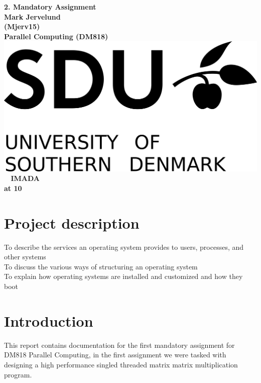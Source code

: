\documentclass[a4paper,10pt,titlepage]{report}
\date{}
\begin{document}
\begin{titlepage}
\centering
    \vspace*{9\baselineskip}
    \huge
    \bfseries
    2. Mandatory Assignment \\
    \normalfont
    Mark Jervelund  \\
    (Mjerv15) \\
	\huge    
    Parallel Computing (DM818)  \\[4\baselineskip]
    \normalfont
	\includegraphics[scale=1]{SDU_logo}
    \vfill\ 
    \vspace{5mm}
    IMADA \\

    \textbf{\datedate}  \bf{at 10} \\[2\baselineskip]
\end{titlepage}

\renewcommand{\thepage}{\roman{page}}%
\tableofcontents
\newpage
\setcounter{page}{1}
\renewcommand{\thepage}{\arabic{page}}
\section{Project description}
To describe the services an operating system provides to
users, processes, and other systems\\
To discuss the various ways of structuring an operating
system\\
To explain how operating systems are installed and
customized and how they boot\\
\newpage

\section{Introduction}
This report contains documentation for the first mandatory assignment for DM818 Parallel Computing, in the first assignment we were tasked with designing a high performance singled threaded matrix matrix multiplication program.
\end{document}
